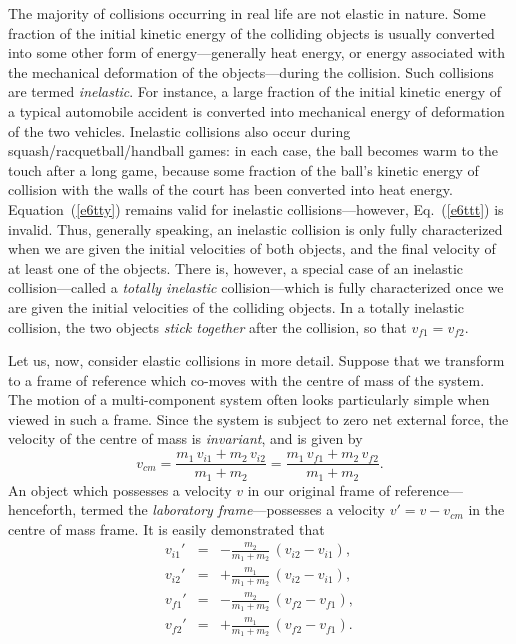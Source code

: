 The majority of collisions occurring in real life are not elastic in nature.
 Some fraction of the initial kinetic
energy of the colliding objects is usually converted into some other form of energy---generally
heat energy, or energy associated with the mechanical deformation of the objects---during the
collision. Such collisions are termed {\em inelastic}. For instance, a large fraction of
the initial kinetic energy of a typical automobile accident is converted into mechanical
energy of deformation of the two vehicles. Inelastic collisions also occur during squash/racquetball/handball
games: in each case,  the ball becomes warm to the touch after a long game, because some
fraction  of the
ball's kinetic energy of collision  with the walls of the court has been converted into
heat energy. Equation~(\ref{e6tty}) remains valid for inelastic collisions---however, Eq.~(\ref{e6ttt})
is invalid. Thus, generally speaking, an inelastic collision is only fully characterized
when we are given the initial velocities of both objects, and the final velocity of
at least  one of the objects.
There is, however,
 a special case of an inelastic collision---called a {\em totally inelastic} collision---which
is fully characterized once we are given the  initial velocities of the colliding objects.
In a totally inelastic collision, the two objects {\em stick together} after the collision, so
that $v_{f1}=v_{f2}$. 

Let us, now, consider elastic collisions in more detail. Suppose that we transform to a frame of
reference which co-moves with the centre of mass of the system. The motion of a multi-component system 
often looks particularly simple when viewed
in such a frame. Since the system is subject to zero net external force, the velocity of the
centre of mass is {\em invariant}, and is given by
\begin{equation}
v_{cm} = \frac{m_1\,v_{i1} + m_2\,v_{i2}}{m_1+m_2}=  \frac{m_1\,v_{f1} + m_2\,v_{f2}}{m_1+m_2}.
\end{equation}
An object which possesses a velocity $v$ in our original frame of reference---hence\-forth, termed
the {\em laboratory frame}---possesses a velocity $v'=v-v_{cm}$ in the centre of mass
frame. It is easily demonstrated that
\begin{eqnarray}
v_{i1}' &=& - \frac{m_2}{m_1+m_2}\,(v_{i2}-v_{i1}),\\[0.5ex]
v_{i2}' &=& + \frac{m_1}{m_1+m_2}\,(v_{i2}-v_{i1}),\\[0.5ex]
v_{f1}' &=& - \frac{m_2}{m_1+m_2}\,(v_{f2}-v_{f1}),\\[0.5ex]
v_{f2}' &=& + \frac{m_1}{m_1+m_2}\,(v_{f2}-v_{f1}).
\end{eqnarray}

